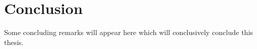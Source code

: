 \chapter{Conclusion}
\label{cha:conc}
Some concluding remarks will appear here which will conclusively conclude this thesis.

%


